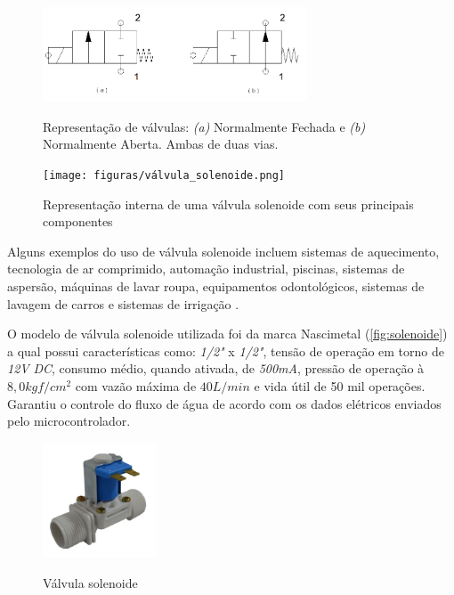 \begin{figure}[H]
	\centering
	\caption{Representação de válvulas: \textit{(a)} Normalmente Fechada  e \textit{(b)} Normalmente Aberta. Ambas de duas vias.}
	\includegraphics[width=0.7\textwidth]{figuras/valvulas.png}
	\label{fig:valvulas}
\end{figure}

\begin{figure}[H]
	\centering
	\caption{Representação interna de uma válvula solenoide com seus principais componentes}
	\texttt{[image: figuras/válvula\_solenoide.png]}
	\label{fig:valvula_solenoide}
\end{figure}

Alguns exemplos do uso de válvula solenoide incluem sistemas de aquecimento, tecnologia de ar comprimido, automação industrial, piscinas, sistemas de aspersão, máquinas de lavar roupa, equipamentos odontológicos, sistemas de lavagem de carros e sistemas de irrigação \cite{Citisystems}.

O modelo de válvula solenoide utilizada foi da marca Nascimetal (\autoref{fig:solenoide}) a qual possui características como:  \textit{1/2"} x \textit{1/2"}, tensão de operação em torno de \textit{12V} \textit{DC}, consumo médio, quando ativada, de \textit{500mA}, pressão de operação à $8,0 kgf/cm^2$ com vazão máxima de $40L/min$ e vida útil de 50 mil operações. Garantiu o controle do fluxo de água de acordo com os dados elétricos enviados pelo microcontrolador.

\begin{figure}[H]
	\centering
	\caption{Válvula solenoide}
	\includegraphics[width=0.3\textwidth]{figuras/solenoide.jpg}
	\label{fig:solenoide}
\end{figure}


